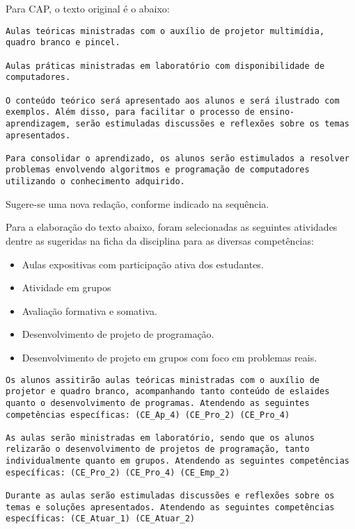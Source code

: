 \documentclass[12pt, oneside]{book}
\begin{document}
Para CAP, o texto original é o abaixo:

\begin{lstlisting}
Aulas teóricas ministradas com o auxílio de projetor multimídia, quadro branco e pincel.

Aulas práticas ministradas em laboratório com disponibilidade de computadores.

O conteúdo teórico será apresentado aos alunos e será ilustrado com exemplos. Além disso, para facilitar o processo de ensino-aprendizagem, serão estimuladas discussões e reflexões sobre os temas apresentados.

Para consolidar o aprendizado, os alunos serão estimulados a resolver problemas envolvendo algoritmos e programação de computadores utilizando o conhecimento adquirido.
\end{lstlisting}

Sugere-se uma nova redação, conforme indicado na sequência.

Para a elaboração do texto abaixo, foram selecionadas as seguintes atividades dentre as sugeridas na ficha da disciplina para as diversas competências:

\begin{itemize}
    \item Aulas expositivas com participação ativa dos estudantes.
    \item Atividade em grupos
    \item Avaliação formativa e somativa.
    \item Desenvolvimento de projeto de programação.
    \item Desenvolvimento de projeto em grupos com foco em problemas reais.
\end{itemize}

\begin{lstlisting}
Os alunos assitirão aulas teóricas ministradas com o auxílio de projetor e quadro branco, acompanhando tanto conteúdo de eslaides quanto o desenvolvimento de programas. Atendendo as seguintes competências específicas: (CE_Ap_4) (CE_Pro_2) (CE_Pro_4)

As aulas serão ministradas em laboratório, sendo que os alunos relizarão o desenvolvimento de projetos de programação, tanto individualmente quanto em grupos. Atendendo as seguintes competências específicas: (CE_Pro_2) (CE_Pro_4) (CE_Emp_2)

Durante as aulas serão estimuladas discussões e reflexões sobre os temas e soluções apresentados. Atendendo as seguintes competências específicas: (CE_Atuar_1) (CE_Atuar_2)
\end{lstlisting}
\end{document}

